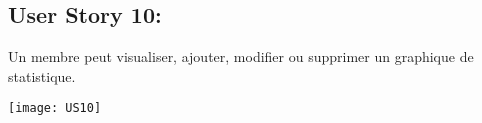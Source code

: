 \newpage{}
\subsection{User Story 10:}
Un membre peut  visualiser, ajouter, modifier ou supprimer un graphique de statistique.


  \begin{center}
        \texttt{[image: US10]}
  \end{center}
